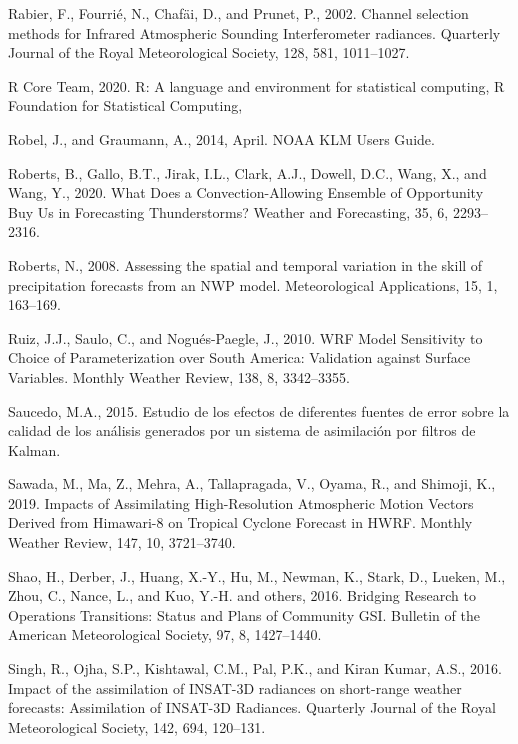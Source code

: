 \documentclass[12pt,oneside,a4paper]{reedthesis}
\begin{document}
\leavevmode\hypertarget{ref-rabier2002}{}%
Rabier, F., Fourrié, N., Chafäi, D., and Prunet, P., 2002. Channel selection methods for Infrared Atmospheric Sounding Interferometer radiances. Quarterly Journal of the Royal Meteorological Society, 128, 581, 1011--1027.

\leavevmode\hypertarget{ref-rcoreteam2020}{}%
R Core Team, 2020. R: A language and environment for statistical computing, R Foundation for Statistical Computing,

\leavevmode\hypertarget{ref-robel2014}{}%
Robel, J., and Graumann, A., 2014, April. NOAA KLM Users Guide.

\leavevmode\hypertarget{ref-roberts2020}{}%
Roberts, B., Gallo, B.T., Jirak, I.L., Clark, A.J., Dowell, D.C., Wang, X., and Wang, Y., 2020. What Does a Convection-Allowing Ensemble of Opportunity Buy Us in Forecasting Thunderstorms? Weather and Forecasting, 35, 6, 2293--2316.

\leavevmode\hypertarget{ref-roberts2008}{}%
Roberts, N., 2008. Assessing the spatial and temporal variation in the skill of precipitation forecasts from an NWP model. Meteorological Applications, 15, 1, 163--169.

\leavevmode\hypertarget{ref-ruiz2010}{}%
Ruiz, J.J., Saulo, C., and Nogués-Paegle, J., 2010. WRF Model Sensitivity to Choice of Parameterization over South America: Validation against Surface Variables. Monthly Weather Review, 138, 8, 3342--3355.

\leavevmode\hypertarget{ref-saucedo2015}{}%
Saucedo, M.A., 2015. Estudio de los efectos de diferentes fuentes de error sobre la calidad de los análisis generados por un sistema de asimilación por filtros de Kalman.

\leavevmode\hypertarget{ref-sawada2019}{}%
Sawada, M., Ma, Z., Mehra, A., Tallapragada, V., Oyama, R., and Shimoji, K., 2019. Impacts of Assimilating High-Resolution Atmospheric Motion Vectors Derived from Himawari-8 on Tropical Cyclone Forecast in HWRF. Monthly Weather Review, 147, 10, 3721--3740.

\leavevmode\hypertarget{ref-shao2016}{}%
Shao, H., Derber, J., Huang, X.-Y., Hu, M., Newman, K., Stark, D., Lueken, M., Zhou, C., Nance, L., and Kuo, Y.-H. and others, 2016. Bridging Research to Operations Transitions: Status and Plans of Community GSI. Bulletin of the American Meteorological Society, 97, 8, 1427--1440.

\leavevmode\hypertarget{ref-singh2016}{}%
Singh, R., Ojha, S.P., Kishtawal, C.M., Pal, P.K., and Kiran Kumar, A.S., 2016. Impact of the assimilation of INSAT-3D radiances on short-range weather forecasts: Assimilation of INSAT-3D Radiances. Quarterly Journal of the Royal Meteorological Society, 142, 694, 120--131.
\end{document}
